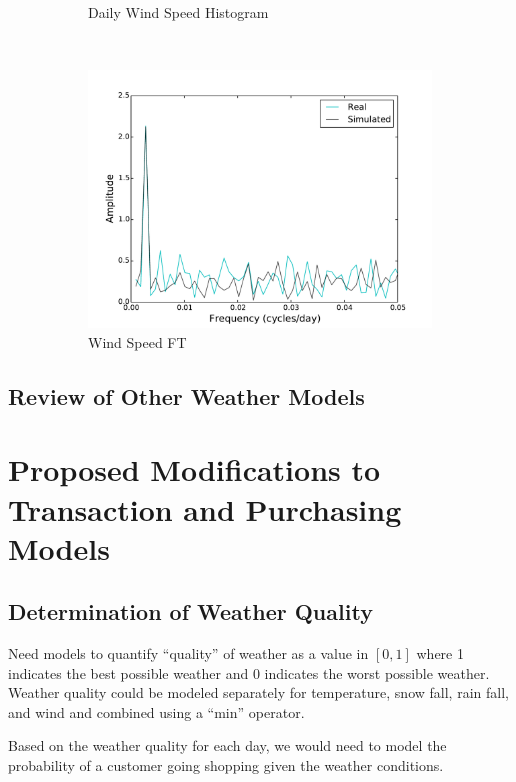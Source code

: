 \documentclass[11pt, letterpaper]{article}
\begin{document}
\begin{figure}[H]
\begin{subfigure}[b]{0.45\textwidth}
    \caption{Daily Wind Speed Histogram}
  \end{subfigure}
  ~
  \begin{subfigure}[b]{0.45\textwidth}
    \includegraphics[width=\textwidth]{figures/daily_wind_speed_fft.pdf}
    \caption{Wind Speed FT}
  \end{subfigure}
  
  \label{fig:analysis}
  \caption{}
\end{figure}


\subsection{Review of Other Weather Models}

\newpage
\section{Proposed Modifications to Transaction and Purchasing Models}

\subsection{Determination of Weather Quality}

Need models to quantify ``quality'' of weather as a value in $[0, 1]$ where 1 indicates the best possible weather and 0 indicates the worst possible weather.  Weather quality could be modeled separately for temperature, snow fall, rain fall, and wind and combined using a ``min'' operator.   

Based on the weather quality for each day, we would need to model the probability of a customer going shopping given the weather conditions.
\end{document}
